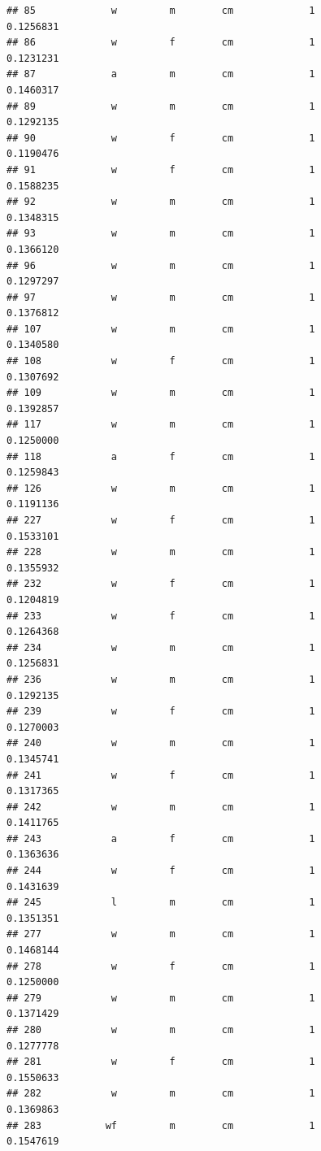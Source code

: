 \documentclass[]{article}
\begin{document}
\begin{verbatim}
## 85             w         m        cm             1          0.1256831
## 86             w         f        cm             1          0.1231231
## 87             a         m        cm             1          0.1460317
## 89             w         m        cm             1          0.1292135
## 90             w         f        cm             1          0.1190476
## 91             w         f        cm             1          0.1588235
## 92             w         m        cm             1          0.1348315
## 93             w         m        cm             1          0.1366120
## 96             w         m        cm             1          0.1297297
## 97             w         m        cm             1          0.1376812
## 107            w         m        cm             1          0.1340580
## 108            w         f        cm             1          0.1307692
## 109            w         m        cm             1          0.1392857
## 117            w         m        cm             1          0.1250000
## 118            a         f        cm             1          0.1259843
## 126            w         m        cm             1          0.1191136
## 227            w         f        cm             1          0.1533101
## 228            w         m        cm             1          0.1355932
## 232            w         f        cm             1          0.1204819
## 233            w         f        cm             1          0.1264368
## 234            w         m        cm             1          0.1256831
## 236            w         m        cm             1          0.1292135
## 239            w         f        cm             1          0.1270003
## 240            w         m        cm             1          0.1345741
## 241            w         f        cm             1          0.1317365
## 242            w         m        cm             1          0.1411765
## 243            a         f        cm             1          0.1363636
## 244            w         f        cm             1          0.1431639
## 245            l         m        cm             1          0.1351351
## 277            w         m        cm             1          0.1468144
## 278            w         f        cm             1          0.1250000
## 279            w         m        cm             1          0.1371429
## 280            w         m        cm             1          0.1277778
## 281            w         f        cm             1          0.1550633
## 282            w         m        cm             1          0.1369863
## 283           wf         m        cm             1          0.1547619

\end{verbatim}
\end{document}
